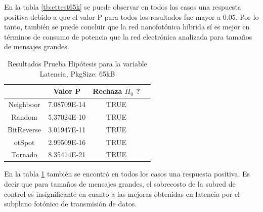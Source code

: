 \documentclass{IEEEtran}
\begin{document}
En la tabla \ref{tb:ettest65k} se puede observar en todos los casos una
respuesta positiva debido a que el valor P para
todos los resultados fue mayor a 0.05. Por lo tanto, también se puede concluir que 
la red nanofotónica híbrida sí es mejor en términos de consumo de potencia
que la red electrónica analizada para tamaños de mensajes grandes.

\begin{table}[]
\centering
\begin{tabular}{|c|c|c|c|}
\hline
&Valor P&Rechaza $H_0$ ?\\
\hline
Neighboor&7.08709E-14&TRUE\\
Random&5.37024E-10&TRUE\\
BitReverse&3.01947E-11&TRUE\\
otSpot&2.99509E-16&TRUE\\
Tornado&8.35414E-21&TRUE\\
\hline
\end{tabular}
\caption{Resultados Prueba Hipótesis para la variable Latencia, PkgSize: 65kB}
\label{tb:lttest65k}
\end{table}

En la tabla \ref{tb:lttest65k} también se encontró en todos los casos una
respuesta positiva. Es decir que para tamaños de mensajes grandes, el sobrecosto
de la subred de control es insignificante en cuanto a las mejoras obtenidas
en latencia por el subplano fotónico de transmisión de datos.
\end{document}
